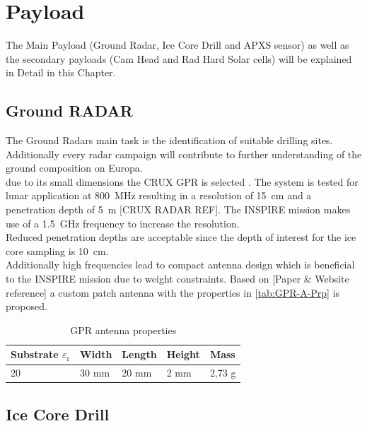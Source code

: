 
\chapter{Payload}
\label{chap:payload}

The Main Payload (Ground Radar, Ice Core Drill and APXS sensor) as well as the secondary payloads (Cam Head and Rad Hard Solar cells) will be explained in Detail in this Chapter.

\section{Ground RADAR}
The Ground Radars main task is the identification of suitable drilling sites. Additionally every radar campaign will contribute to further understanding of the ground composition on Europa.\\

due to its small dimensions the CRUX GPR is selected . The system is tested for lunar application at 800~MHz resulting in a resolution of 15~cm and a penetration depth of 5~m [CRUX RADAR REF]. The INSPIRE mission makes use of a 1.5~GHz frequency to increase the resolution. \\
Reduced penetration depths are acceptable since the depth of interest for the ice core sampling is 10~cm. \\

Additionally high frequencies lead to compact antenna design which is beneficial to the INSPIRE mission due to weight constraints. 
Based on [Paper \& Website reference] a custom patch antenna with the properties in \autoref{tab:GPR-A-Prp} is proposed.

\begin{table}[h]
\centering
\begin{tabular}{lllll}
\toprule
Substrate ${\varepsilon}_\text{r}$ & Width & Length & Height & Mass   \\
\midrule
20                         & 30 mm & 20 mm  & 2 mm   & 2,73 g  \\
\bottomrule
\end{tabular}
\caption{GPR antenna properties}
\label{tab:GPR-A-Prp}
\end{table}

\section{Ice Core Drill}

